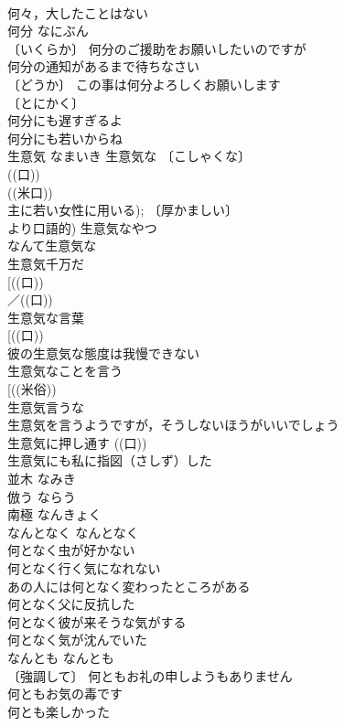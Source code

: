\documentclass[8pt]{extreport}
\begin{document}
\begin{CJK}{UTF8}{min}
\\	何々，大したことはない 
\\	何分	なにぶん	
\\	〔いくらか〕 何分のご援助をお願いしたいのですが 
\\	何分の通知があるまで待ちなさい 
\\	〔どうか〕 この事は何分よろしくお願いします 
\\	〔とにかく〕
\\	何分にも遅すぎるよ 
\\	何分にも若いからね 
\\	生意気	なまいき	生意気な 〔こしゃくな〕
\\	((口)) 
\\	((米口)) 
\\	主に若い女性に用いる); 〔厚かましい〕
\\	より口語的) 生意気なやつ 
\\	なんて生意気な 
\\	生意気千万だ 
\\	[((口))
\\	／((口))
\\	生意気な言葉 
\\	[((口))
\\	彼の生意気な態度は我慢できない 
\\	生意気なことを言う 
\\	[((米俗))
\\	生意気言うな 
\\	生意気を言うようですが，そうしないほうがいいでしょう 
\\	生意気に押し通す ((口)) 
\\	生意気にも私に指図（さしず）した 
\\	並木	なみき	
\\	倣う	ならう	
\\	南極	なんきょく	
\\	なんとなく	なんとなく	
\\	何となく虫が好かない 
\\	何となく行く気になれない 
\\	あの人には何となく変わったところがある 
\\	何となく父に反抗した 
\\	何となく彼が来そうな気がする 
\\	何となく気が沈んでいた 
\\	なんとも	なんとも	
\\	〔強調して〕 何ともお礼の申しようもありません 
\\	何ともお気の毒です 
\\	何とも楽しかった 

\end{CJK}
\end{document}
